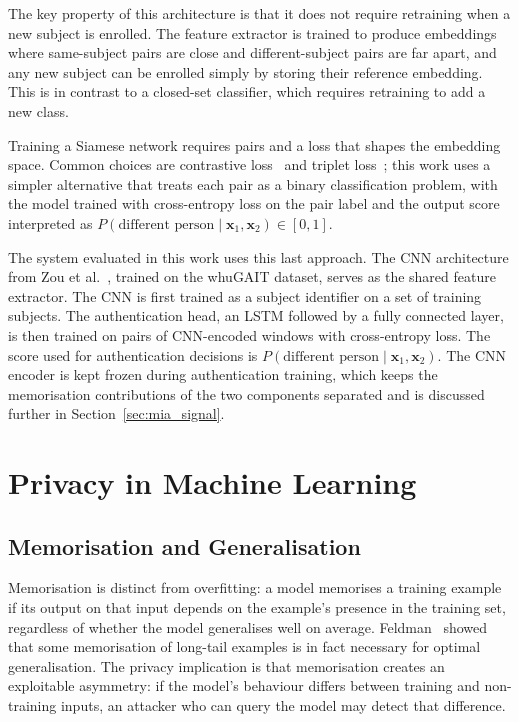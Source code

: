 The key property of this architecture is that it does not require retraining when a new subject is enrolled. The feature extractor is trained to produce embeddings where same-subject pairs are close and different-subject pairs are far apart, and any new subject can be enrolled simply by storing their reference embedding. This is in contrast to a closed-set classifier, which requires retraining to add a new class.

Training a Siamese network requires pairs and a loss that shapes the embedding space. Common choices are contrastive loss~\cite{hadsell2006dimensionality} and triplet loss~\cite{schroff2015facenet}; this work uses a simpler alternative that treats each pair as a binary classification problem, with the model trained with cross-entropy loss on the pair label and the output score interpreted as $P(\text{different person} \mid \mathbf{x}_1, \mathbf{x}_2) \in [0, 1]$.

The system evaluated in this work uses this last approach. The CNN architecture from Zou et al.~\cite{zou2020deep}, trained on the whuGAIT dataset, serves as the shared feature extractor. The CNN is first trained as a subject identifier on a set of training subjects. The authentication head, an LSTM followed by a fully connected layer, is then trained on pairs of CNN-encoded windows with cross-entropy loss. The score used for authentication decisions is $P(\text{different person} \mid \mathbf{x}_1, \mathbf{x}_2)$. The CNN encoder is kept frozen during authentication training, which keeps the memorisation contributions of the two components separated and is discussed further in Section~\ref{sec:mia_signal}.

\section{Privacy in Machine Learning}
\label{sec:bg_privacy}

\subsection{Memorisation and Generalisation}
\label{ssec:bg_memorisation}

Memorisation is distinct from overfitting: a model memorises a training example if its output on that input depends on the example's presence in the training set, regardless of whether the model generalises well on average. Feldman~\cite{feldman2020does} showed that some memorisation of long-tail examples is in fact necessary for optimal generalisation. The privacy implication is that memorisation creates an exploitable asymmetry: if the model's behaviour differs between training and non-training inputs, an attacker who can query the model may detect that difference.

